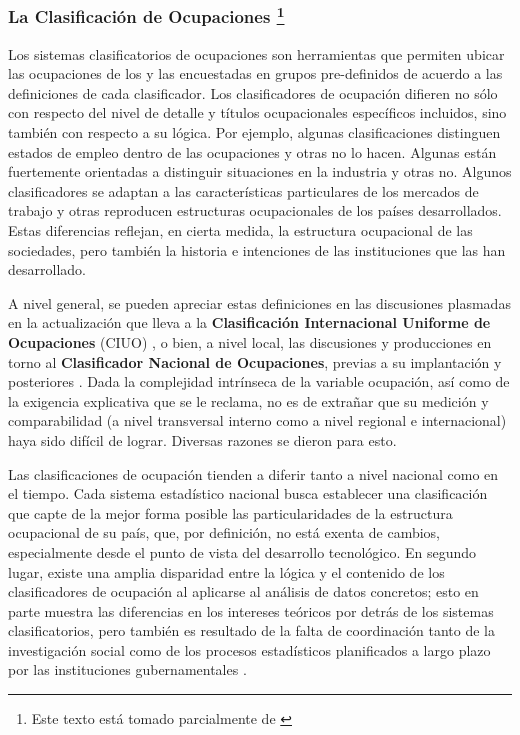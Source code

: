 \documentclass[
]{book}
\begin{document}
\hypertarget{la-clasificaciuxf3n-de-ocupaciones}{%
\subsubsection[La Clasificación de Ocupaciones ]{\texorpdfstring{La Clasificación de Ocupaciones \footnote{ Este texto está tomado parcialmente de \citep{Sacco2016b}}}{La Clasificación de Ocupaciones }}\label{la-clasificaciuxf3n-de-ocupaciones}}

Los sistemas clasificatorios de ocupaciones son herramientas que permiten ubicar las ocupaciones de los y las encuestadas en grupos pre-definidos de acuerdo a las definiciones de cada clasificador. Los clasificadores de ocupación difieren no sólo con respecto del nivel de detalle y títulos ocupacionales específicos incluidos, sino también con respecto a su lógica. Por ejemplo, algunas clasificaciones distinguen estados de empleo dentro de las ocupaciones y otras no lo hacen. Algunas están fuertemente orientadas a distinguir situaciones en la industria y otras no. Algunos clasificadores se adaptan a las características particulares de los mercados de trabajo y otras reproducen estructuras ocupacionales de los países desarrollados. Estas diferencias reflejan, en cierta medida, la estructura ocupacional de las sociedades, pero también la historia e intenciones de las instituciones que las han desarrollado.

A nivel general, se pueden apreciar estas definiciones en las discusiones plasmadas en la actualización que lleva a la \textbf{Clasificación Internacional Uniforme de Ocupaciones} (CIUO) \citep{Budlender2003, Hoffmann1999}, o bien, a nivel local, las discusiones y producciones en torno al \textbf{Clasificador Nacional de Ocupaciones}, previas a su implantación \citep{Elizalde1987, INDEC1990, INDEC1991} y posteriores \citep{Elizalde1993, Torrado1993, Torrado1993a}. Dada la complejidad intrínseca de la variable ocupación, así como de la exigencia explicativa que se le reclama, no es de extrañar que su medición y comparabilidad (a nivel transversal interno como a nivel regional e internacional) haya sido difícil de lograr. Diversas razones se dieron para esto.

Las clasificaciones de ocupación tienden a diferir tanto a nivel nacional como en el tiempo. Cada sistema estadístico nacional busca establecer una clasificación que capte de la mejor forma posible las particularidades de la estructura ocupacional de su país, que, por definición, no está exenta de cambios, especialmente desde el punto de vista del desarrollo tecnológico. En segundo lugar, existe una amplia disparidad entre la lógica y el contenido de los clasificadores de ocupación al aplicarse al análisis de datos concretos; esto en parte muestra las diferencias en los intereses teóricos por detrás de los sistemas clasificatorios, pero también es resultado de la falta de coordinación tanto de la investigación social como de los procesos estadísticos planificados a largo plazo por las instituciones gubernamentales \citep{Ganzeboom1996}.
\end{document}
